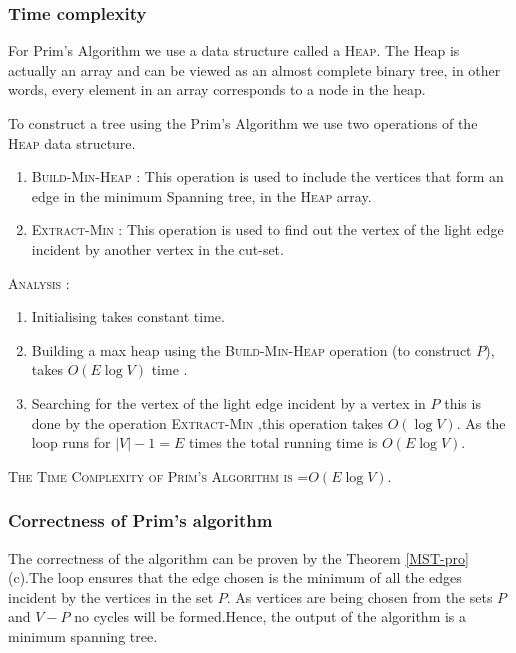 \documentclass[12pt]{article}
\theoremstyle{plain}
\begin{document}
\subsubsection*{Time complexity}

For Prim's Algorithm we use a data structure called a \textsc{Heap}. The Heap is actually an array and can be viewed as an almost complete binary tree, in other words, every element in an array corresponds to a node in the heap. 


To construct a tree using the Prim's Algorithm we use two operations of the \textsc{Heap} data structure.
\begin{enumerate}
\item \textsc{Build-Min-Heap :} This operation is used to include the vertices that form an edge in the minimum Spanning tree, in the \textsc{Heap} array.
\item \textsc{Extract-Min :} This operation is used to find out the vertex of the light edge incident by another vertex in the cut-set.
\end{enumerate} 
 
\textsc{Analysis :}
\begin{enumerate}
\item Initialising takes constant time.
\item Building a max heap using the \textsc{Build-Min-Heap } operation (to construct $P$), takes $O(E \log V)$ time .
\item Searching for the vertex of the light edge incident by a vertex in $P$ this is done by the operation \textsc{Extract-Min} ,this operation takes $O(\log V)$. As the loop runs for $|V|-1=E $ times the total running time is $O(E \log V)$.
\end{enumerate}
\noindent 
\textsc{The Time Complexity of Prim's Algorithm is }=$O(E\log V)$.

\subsubsection*{Correctness of Prim's algorithm}

The correctness of the algorithm can be proven by the Theorem \ref{MST-pro} (c).The loop ensures that the edge chosen is the minimum of all the edges incident by the vertices in the set $P$. As vertices are being chosen from the sets $P$ and $V-P$ no cycles will be formed.Hence, the output of the algorithm is a minimum spanning tree.
\end{document}
